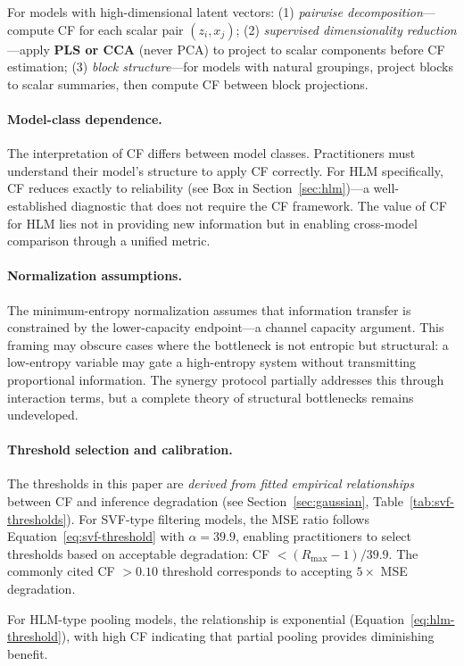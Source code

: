 \documentclass[10pt]{article} %
\theoremstyle{plain}
\theoremstyle{definition}
\begin{document}
\noindent For models with high-dimensional latent vectors: (1) \emph{pairwise decomposition}---compute CF for each scalar pair $(z_i, x_j)$; (2) \emph{supervised dimensionality reduction}---apply \textbf{PLS or CCA} (never PCA) to project to scalar components before CF estimation; (3) \emph{block structure}---for models with natural groupings, project blocks to scalar summaries, then compute CF between block projections.

\paragraph{Model-class dependence.} The interpretation of CF differs between model classes. Practitioners must understand their model's structure to apply CF correctly. For HLM specifically, CF reduces exactly to reliability (see Box in Section~\ref{sec:hlm})---a well-established diagnostic that does not require the CF framework. The value of CF for HLM lies not in providing new information but in enabling cross-model comparison through a unified metric.

\paragraph{Normalization assumptions.} The minimum-entropy normalization assumes that information transfer is constrained by the lower-capacity endpoint---a channel capacity argument. This framing may obscure cases where the bottleneck is not entropic but structural: a low-entropy variable may gate a high-entropy system without transmitting proportional information. The synergy protocol partially addresses this through interaction terms, but a complete theory of structural bottlenecks remains undeveloped.

\paragraph{Threshold selection and calibration.} The thresholds in this paper are \emph{derived from fitted empirical relationships} between CF and inference degradation (see Section~\ref{sec:gaussian}, Table~\ref{tab:svf-thresholds}). For SVF-type filtering models, the MSE ratio follows Equation~\ref{eq:svf-threshold} with $\alpha = 39.9$, enabling practitioners to select thresholds based on acceptable degradation: CF $< (R_{\max} - 1)/39.9$. The commonly cited CF $> 0.10$ threshold corresponds to accepting $5\times$ MSE degradation.

For HLM-type pooling models, the relationship is exponential (Equation~\ref{eq:hlm-threshold}), with high CF indicating that partial pooling provides diminishing benefit.
\end{document}
